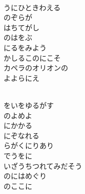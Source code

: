 \documentclass[10pt,b5j]{tarticle} %
\begin{document}
\vspace{1.5em} %
\newcommand{\linespace}{0.5em} %
\newcommand{\blocksize}{0.5\hsize} %
\newcommand{\itemmargin}{6em} %
\begin{enumerate} %
    \setlength{\itemindent}{\itemmargin} %
    \begin{minipage}[c]{\blocksize}
    
        \vspace{\linespace}
        \item~\\
        うにひときわえる\\
        のぞらが\\
        はちてがし\\
        のはをぶ\\
        にるをみよう\\
        かしるこのにこそ\\
        カペラのオリオンの\\
        よよらにえ
        
        \vspace{\linespace}
        \item~\\
        をいをゆるがす\\
        のよめよ\\
        にかかる\\
        にぞなれる\\
        らがくにりあり\\
        でうをに\\
        いざうちつれてみだそう\\
        のにはめぐり\\
        のここに
    
    \end{minipage}
\end{enumerate} %
\end{document}
